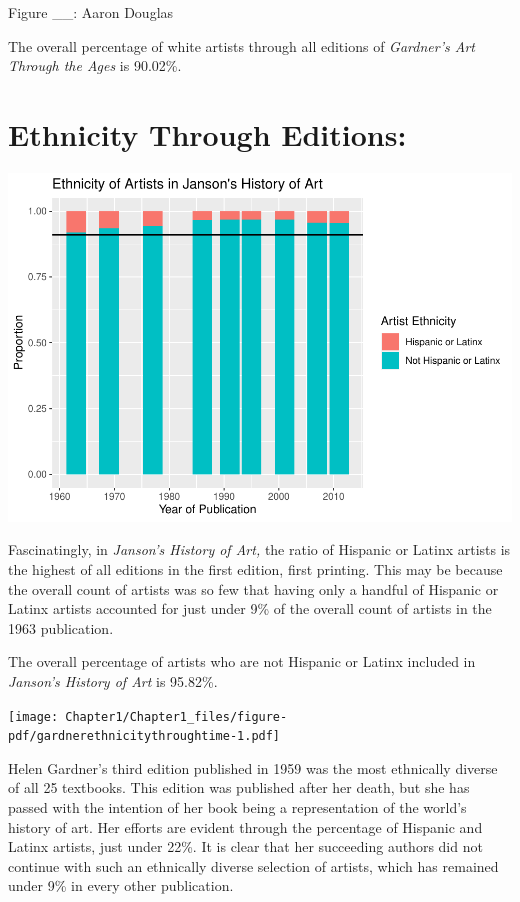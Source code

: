 \documentclass[
  letterpaper,
  DIV=11,
  numbers=noendperiod]{scrreprt}
\begin{document}
Figure \_\_: Aaron Douglas

The overall percentage of white artists through all editions of
\emph{Gardner's Art Through the Ages} is 90.02\%.

\hypertarget{ethnicity-through-editions}{%
\section{\texorpdfstring{\textbf{Ethnicity Through
Editions:}}{Ethnicity Through Editions:}}\label{ethnicity-through-editions}}

\includegraphics{Chapter1/Chapter1_files/figure-pdf/jansonethnicitythroughtime-1.pdf}

Fascinatingly, in \emph{Janson's History of Art,} the ratio of Hispanic
or Latinx artists is the highest of all editions in the first edition,
first printing. This may be because the overall count of artists was so
few that having only a handful of Hispanic or Latinx artists accounted
for just under 9\% of the overall count of artists in the 1963
publication.

The overall percentage of artists who are not Hispanic or Latinx
included in \emph{Janson's History of Art} is 95.82\%.

\texttt{[image: Chapter1/Chapter1\_files/figure-pdf/gardnerethnicitythroughtime-1.pdf]}

Helen Gardner's third edition published in 1959 was the most ethnically
diverse of all 25 textbooks. This edition was published after her death,
but she has passed with the intention of her book being a representation
of the world's history of art. Her efforts are evident through the
percentage of Hispanic and Latinx artists, just under 22\%. It is clear
that her succeeding authors did not continue with such an ethnically
diverse selection of artists, which has remained under 9\% in every
other publication.
\end{document}

